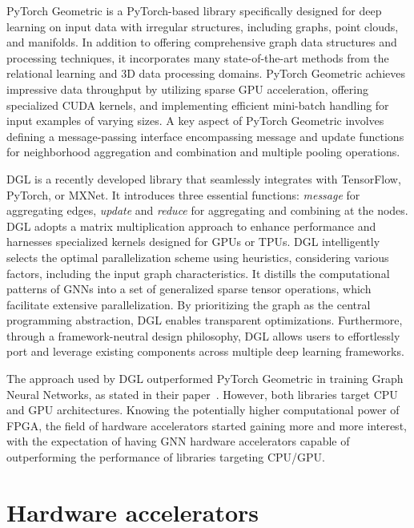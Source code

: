 PyTorch Geometric is a PyTorch-based library specifically designed for deep learning on input data with irregular structures, including graphs, point clouds, and manifolds.
In addition to offering comprehensive graph data structures and processing techniques, it incorporates many state-of-the-art methods from the relational learning and 3D data processing domains.
PyTorch Geometric achieves impressive data throughput by utilizing sparse GPU acceleration, offering specialized CUDA kernels, and implementing efficient mini-batch handling for input examples of varying sizes.
A key aspect of PyTorch Geometric involves defining a message-passing interface encompassing message and update functions for neighborhood aggregation and combination and multiple pooling operations.

DGL is a recently developed library that seamlessly integrates with TensorFlow, PyTorch, or MXNet.
It introduces three essential functions: \textit{message} for aggregating edges, \textit{update} and \textit{reduce} for aggregating and combining at the nodes.
DGL adopts a matrix multiplication approach to enhance performance and harnesses specialized kernels designed for GPUs or TPUs.
DGL intelligently selects the optimal parallelization scheme using heuristics, considering various factors, including the input graph characteristics.
It distills the computational patterns of GNNs into a set of generalized sparse tensor operations, which facilitate extensive parallelization.
By prioritizing the graph as the central programming abstraction, DGL enables transparent optimizations.
Furthermore, through a framework-neutral design philosophy, DGL allows users to effortlessly port and leverage existing components across multiple deep learning frameworks.

The approach used by DGL outperformed PyTorch Geometric in training Graph Neural Networks, as stated in their paper~\cite{DBLP:journals/corr/abs-1909-01315}.
However, both libraries target CPU and GPU architectures.
Knowing the potentially higher computational power of FPGA, the field of hardware accelerators started gaining more and more interest, with the expectation of having GNN hardware accelerators capable of outperforming the performance of libraries targeting CPU/GPU.

\section{Hardware accelerators}
\label{sec:hardware_accelerators}%

